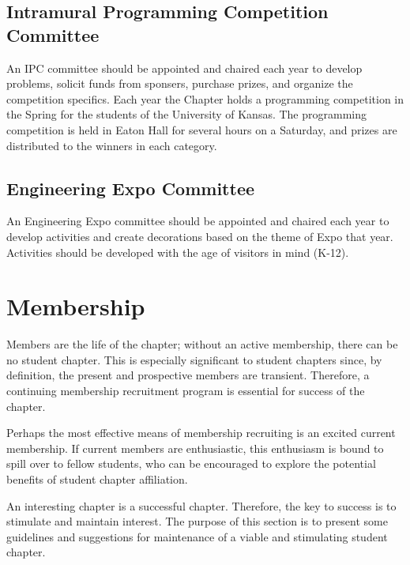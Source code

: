 \subsection*{Intramural Programming Competition Committee}
An IPC committee should be appointed and chaired each year to develop problems, solicit funds from sponsers, purchase prizes, and organize the competition specifics. Each year the Chapter holds a programming competition in the Spring for the students of the University of Kansas. The programming competition is held in Eaton Hall for several hours on a Saturday, and prizes are distributed to the winners in each category.
\subsection*{Engineering Expo Committee}
An Engineering Expo committee should be appointed and chaired each year to develop activities and create decorations based on the theme of Expo that year. Activities should be developed with the age of visitors in mind (K-12).

\section{Membership}

Members are the life of the chapter; without an active membership, there can be no student chapter. This is especially significant to student chapters since, by definition, the present and prospective members are transient. Therefore, a continuing membership recruitment program is essential for success of the chapter.

Perhaps the most effective means of membership recruiting is an excited current membership. If current members are enthusiastic, this enthusiasm is bound to spill over to fellow students, who can be encouraged to explore the potential benefits of student chapter affiliation.

An interesting chapter is a successful chapter. Therefore, the key to success is to stimulate and maintain interest. The purpose of this section is to present some guidelines and suggestions for maintenance of a viable and stimulating student chapter.

